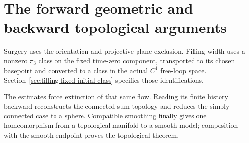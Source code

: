 \section{The forward geometric and backward topological arguments}
\label{sec:foundations-route}

Surgery uses the orientation and projective-plane exclusion. Filling
width uses a nonzero $\pi_3$ class on the fixed time-zero component,
transported to its chosen basepoint and converted to a class in the
actual $C^1$ free-loop space.
Section~\ref{sec:filling-fixed-initial-class} specifies those identifications.

The estimates force extinction of that same flow. Reading its finite
history backward reconstructs the connected-sum topology and reduces
the simply connected case to a sphere. Compatible smoothing finally
gives one homeomorphism from a topological manifold to a smooth model;
composition with the smooth endpoint proves the topological theorem.
